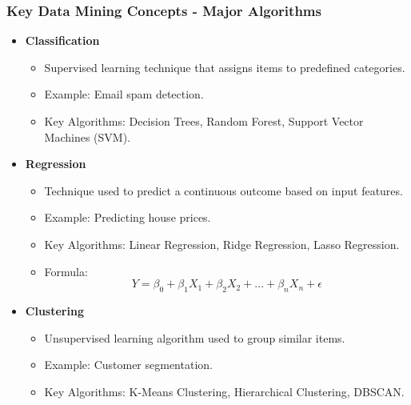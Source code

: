 \documentclass{beamer}
\begin{document}
\begin{frame}[fragile]
    \frametitle{Key Data Mining Concepts - Major Algorithms}
    \begin{itemize}
        \item \textbf{Classification}
            \begin{itemize}
                \item Supervised learning technique that assigns items to predefined categories.
                \item Example: Email spam detection.
                \item Key Algorithms: Decision Trees, Random Forest, Support Vector Machines (SVM).
            \end{itemize}
        \item \textbf{Regression}
            \begin{itemize}
                \item Technique used to predict a continuous outcome based on input features.
                \item Example: Predicting house prices.
                \item Key Algorithms: Linear Regression, Ridge Regression, Lasso Regression.
                \item Formula: 
                \begin{equation}
                    Y = \beta_0 + \beta_1X_1 + \beta_2X_2 + ... + \beta_nX_n + \epsilon
                \end{equation}
            \end{itemize}
        \item \textbf{Clustering}
            \begin{itemize}
                \item Unsupervised learning algorithm used to group similar items.
                \item Example: Customer segmentation.
                \item Key Algorithms: K-Means Clustering, Hierarchical Clustering, DBSCAN.
            \end{itemize}
    \end{itemize}
\end{frame}
\end{document}
